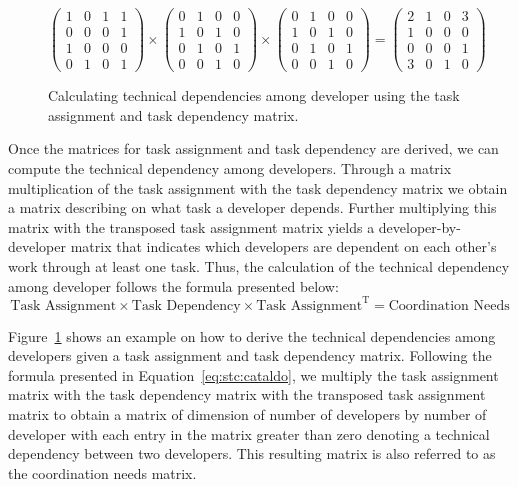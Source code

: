 \begin{figure}[t!]
\centering
\[
\left(
\begin{matrix}
1 & 0 & 1 & 1\\
0 & 0 & 0 & 1\\
1 & 0 & 0 & 0\\
0 & 1 & 0 & 1
\end{matrix}
\right)
\times
\left(
\begin{matrix}
0 & 1 & 0 & 0\\
1 & 0 & 1 & 0\\
0 & 1 & 0 & 1\\
0 & 0 & 1 & 0
\end{matrix}
\right)
\times
\left(
\begin{matrix}
0 & 1 & 0 & 0\\
1 & 0 & 1 & 0\\
0 & 1 & 0 & 1\\
0 & 0 & 1 & 0
\end{matrix}
\right)
=
\left(
\begin{matrix}
2 & 1 & 0 & 3\\
1 & 0 & 0 & 0\\
0 & 0 & 0 & 1\\
3 & 0 & 1 & 0
\end{matrix}
\right)
\]
\caption{Calculating technical dependencies among developer using the task assignment and task dependency matrix.}
\label{chap:3:fig:example:stc:cataldo}
\end{figure}
Once the matrices for task assignment and task dependency are derived, we can compute the technical dependency among developers.
Through a matrix multiplication of the task assignment with the task dependency matrix we obtain a matrix describing on what task a developer depends.
Further multiplying this matrix with the transposed task assignment matrix yields a developer-by-developer matrix that indicates which developers are dependent on each other's work through at least one task. 
%
Thus, the calculation of the technical dependency among developer follows the formula presented below:
\begin{equation}
\label{eq:stc:cataldo}
\text{Task Assignment} \times \text{Task Dependency} \times \text{Task Assignment}^{\text{T}} = \text{Coordination Needs}
\end{equation}

Figure~\ref{chap:3:fig:example:stc:cataldo} shows an example on how to derive the technical dependencies among developers given a task assignment and task dependency matrix.
Following the formula presented in Equation~\ref{eq:stc:cataldo}, we multiply the task assignment matrix with the task dependency matrix with the transposed task assignment matrix to obtain a matrix of dimension of number of developers by number of developer with each entry in the matrix greater than zero denoting a technical dependency between two developers.
This resulting matrix is also referred to as the coordination needs matrix.

